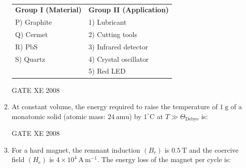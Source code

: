 \documentclass[12pt]{article}
\begin{document}
\begin{enumerate}
\begin{table}[H]     \centering     \caption{}     \label{}     \begin{tabular}{l l}
\textbf{Group I (Material)} & \textbf{Group II (Application)} \\
P) Graphite & 1) Lubricant \\
Q) Cermet & 2) Cutting tools \\
R) PbS & 3) Infrared detector \\
S) Quartz & 4) Crystal oscillator \\
 & 5) Red LED \\
\end{tabular} \end{table}

\begin{enumerate}
\end{enumerate}

GATE XE 2008

\item At constant volume, the energy required to raise the temperature of $1 \ \mathrm{g}$ of a monatomic solid (atomic mass: $24 \ \mathrm{amu}$) by $1^\circ \mathrm{C}$ at $T \gg \Theta_{\mathrm{Debye}}$ is:

\begin{enumerate}
\end{enumerate}

GATE XE 2008

\item For a hard magnet, the remnant induction $(B_r)$ is $0.5 \ \mathrm{T}$ and the coercive field $(H_c)$ is $4 \times 10^4 \ \mathrm{A \, m^{-1}}$. The energy loss of the magnet per cycle is:

\begin{enumerate}
\end{enumerate}


\end{enumerate}
\end{document}
